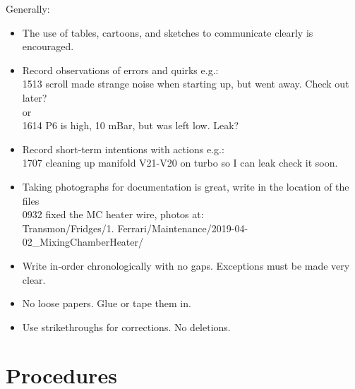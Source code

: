 \documentclass{article}[18pt,A4]
\newenvironment{handwritten}{\fontfamily{pzc}\selectfont\large}{}
\begin{document}
Generally:
\begin{itemize}
\item The use of tables, cartoons, and sketches to communicate clearly is encouraged.
\item Record observations of errors and quirks e.g.:\\
\begin{handwritten}
1513 scroll made strange noise when starting up, but went away. Check out later?
\end{handwritten}\\
or\\
\begin{handwritten}
1614 P6 is high, 10 mBar, but was left low. Leak? 
\end{handwritten}
\item Record short-term intentions with actions e.g.:\\
\begin{handwritten}
1707 cleaning up manifold V21-V20 on turbo so I can leak check it soon. 
\end{handwritten}

\item Taking photographs for documentation is great, write in the location of the files\\
\begin{handwritten}
0932 fixed the MC heater wire, photos at:\\
\hspace{2em} Transmon/Fridges/1. Ferrari/Maintenance/2019-04-02\_MixingChamberHeater/
\end{handwritten}

\item Write in-order chronologically with no gaps. Exceptions must be made very clear.
\item No loose papers. Glue or tape them in.
\item Use strikethroughs for corrections. No deletions. 
\end{itemize}







\newpage
\section{Procedures}
\end{document}
